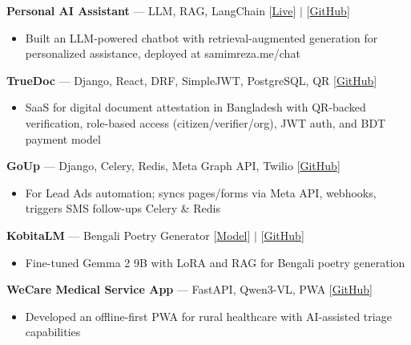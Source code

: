 \documentclass[letterpaper,11pt]{extarticle}
\begin{document}
\vspace{0.2cm}
\textbf{Personal AI Assistant} --- LLM, RAG, LangChain \hfill [\href{https://samimreza.me/chat}{Live}] $|$ [\href{https://github.com/samim-reza/MyChatBot}{GitHub}]
\begin{itemize}[noitemsep, topsep=0pt]
    \item Built an LLM-powered chatbot with retrieval-augmented generation for personalized assistance, deployed at samimreza.me/chat
\end{itemize}

\vspace{0.2cm}
\textbf{TrueDoc} --- Django, React, DRF, SimpleJWT, PostgreSQL, QR \hfill [\href{https://github.com/samim-reza/TrueDoc}{GitHub}]
\begin{itemize}[noitemsep, topsep=0pt]
    \item SaaS for digital document attestation in Bangladesh with QR-backed verification, role-based access (citizen/verifier/org), JWT auth, and BDT payment model
\end{itemize}

\vspace{0.2cm}
\textbf{GoUp} --- Django, Celery, Redis, Meta Graph API, Twilio \hfill [\href{https://github.com/samim-reza/GoUp}{GitHub}]
\begin{itemize}[noitemsep, topsep=0pt]
    \item For Lead Ads automation; syncs pages/forms via Meta API, webhooks, triggers SMS follow-ups Celery \& Redis
\end{itemize}

\vspace{0.2cm}
\textbf{KobitaLM} --- Bengali Poetry Generator \hfill [\href{https://huggingface.co/samim-reza/KobitaLM}{Model}] $|$ [\href{https://github.com/samim-reza/KobitaLM}{GitHub}]
\begin{itemize}[noitemsep, topsep=0pt]
    \item Fine-tuned Gemma 2 9B with LoRA and RAG for Bengali poetry generation
\end{itemize}

\vspace{0.2cm}
\textbf{WeCare Medical Service App} --- FastAPI, Qwen3-VL, PWA \hfill [\href{https://github.com/samim-reza/FutureBuilders2025_GreenU_Tensors}{GitHub}]
\begin{itemize}[noitemsep, topsep=0pt]
    \item Developed an offline-first PWA for rural healthcare with AI-assisted triage capabilities
\end{itemize}
\end{document}
